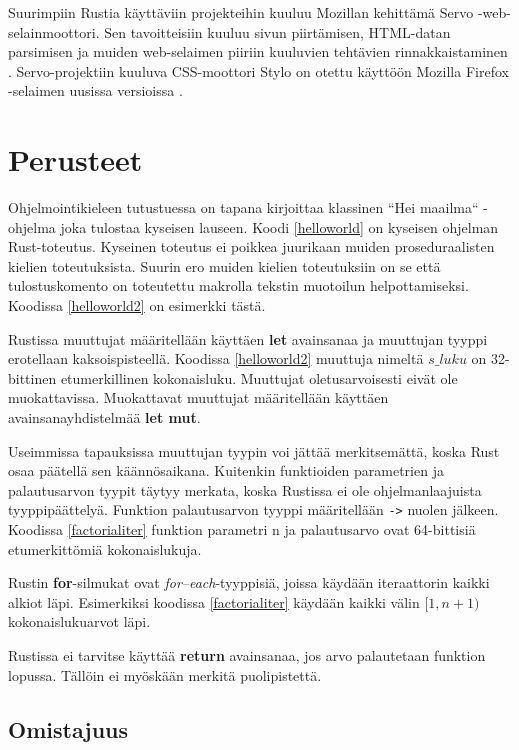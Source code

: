 \documentclass[finnish]{tktltiki2}
\theoremstyle{definition}
\theoremstyle{remark}
\begin{document}
Suurimpiin Rustia käyttäviin projekteihin kuuluu Mozillan kehittämä Servo -web-selainmoottori. Sen tavoitteisiin kuuluu sivun piirtämisen, HTML-datan parsimisen ja muiden web-selaimen piiriin kuuluvien tehtävien rinnakkaistaminen \cite{QuantumSuperFastCSSEngine}. Servo-projektiin kuuluva CSS-moottori Stylo on otettu käyttöön Mozilla Firefox -selaimen uusissa versioissa \cite{StyloIncludedInFirefox}.

\section{Perusteet}

Ohjelmointikieleen tutustuessa on tapana kirjoittaa klassinen ``Hei maailma`` -ohjelma joka tulostaa kyseisen lauseen. Koodi \ref{helloworld} on kyseisen ohjelman Rust-toteutus. Kyseinen toteutus ei poikkea juurikaan muiden proseduraalisten kielien toteutuksista. Suurin ero muiden kielien toteutuksiin on se että tulostuskomento on toteutettu makrolla tekstin muotoilun helpottamiseksi. Koodissa \ref{helloworld2} on esimerkki tästä.

Rustissa muuttujat määritellään käyttäen \textbf{let} avainsanaa ja muuttujan tyyppi erotellaan kaksoispisteellä. Koodissa \ref{helloworld2} muuttuja nimeltä \texttt{$s\_luku$} on 32-bittinen etumerkillinen kokonaisluku. Muuttujat oletusarvoisesti eivät ole muokattavissa. Muokattavat muuttujat määritellään käyttäen avainsanayhdistelmää \textbf{let mut}. 

Useimmissa tapauksissa muuttujan tyypin voi jättää merkitsemättä, koska Rust osaa päätellä sen käännösaikana. Kuitenkin funktioiden parametrien ja palautusarvon tyypit täytyy merkata, koska Rustissa ei ole ohjelmanlaajuista tyyppipäättelyä. Funktion palautusarvon tyyppi määritellään \texttt{->} nuolen jälkeen. Koodissa \ref{factorialiter} funktion parametri n ja palautusarvo ovat 64-bittisiä etumerkittömiä kokonaislukuja.

Rustin \textbf{for}-silmukat ovat \textit{for--each}-tyyppisiä, joissa käydään iteraattorin kaikki alkiot läpi. Esimerkiksi koodissa \ref{factorialiter} käydään kaikki välin $[1, n+1)$ kokonaislukuarvot läpi.

Rustissa ei tarvitse käyttää \textbf{return} avainsanaa, jos arvo palautetaan funktion lopussa. Tällöin ei myöskään merkitä puolipistettä.

\subsection{Omistajuus}
\end{document}
